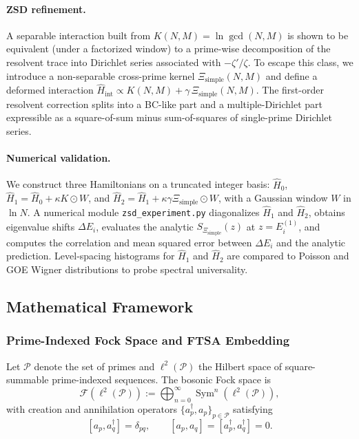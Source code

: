 \documentclass[11pt]{article}
\begin{document}
\paragraph{ZSD refinement.}
A separable interaction built from $K(N,M) = \ln\gcd(N,M)$ is shown to
be equivalent (under a factorized window) to a prime-wise decomposition
of the resolvent trace into Dirichlet series associated with
$-\zeta'/\zeta$. To escape this class, we introduce a non-separable
cross-prime kernel $\Xi_{\text{simple}}(N,M)$ and define a deformed
interaction
$\hat{H}_{\text{int}} \propto K(N,M) + \gamma\,\Xi_{\text{simple}}(N,M)$.
The first-order resolvent correction splits into a BC-like part and a
multiple-Dirichlet part expressible as a
square-of-sum minus sum-of-squares of single-prime Dirichlet series.

\paragraph{Numerical validation.}
We construct three Hamiltonians on a truncated integer basis:
$\hat{H}_0$, $\hat{H}_1 = \hat{H}_0 + \kappa K \odot W$, and
$\hat{H}_2 = \hat{H}_1 + \kappa\gamma \Xi_{\text{simple}} \odot W$,
with a Gaussian window $W$ in $\ln N$. A numerical module
\texttt{zsd\_experiment.py} diagonalizes $\hat{H}_1$ and $\hat{H}_2$,
obtains eigenvalue shifts $\Delta E_i$, evaluates the analytic
$S_{\Xi_{\text{simple}}}(z)$ at $z = E_i^{(1)}$, and computes the
correlation and mean squared error between $\Delta E_i$ and the
analytic prediction. Level-spacing histograms for $\hat{H}_1$ and
$\hat{H}_2$ are compared to Poisson and GOE Wigner distributions to
probe spectral universality.

\subsection{Mathematical Framework}

\subsubsection{Prime-Indexed Fock Space and FTSA Embedding}

Let $\mathcal{P}$ denote the set of primes and $\ell^2(\mathcal{P})$
the Hilbert space of square-summable prime-indexed sequences. The
bosonic Fock space is
\[
  \mathcal{F}(\ell^2(\mathcal{P}))
    := \bigoplus_{n=0}^\infty \operatorname{Sym}^n(\ell^2(\mathcal{P})),
\]
with creation and annihilation operators
$\{a_p^\dagger, a_p\}_{p\in\mathcal{P}}$ satisfying
\[
  [a_p, a_q^\dagger] = \delta_{pq}, \qquad
  [a_p, a_q] = [a_p^\dagger, a_q^\dagger] = 0.
\]
\end{document}
